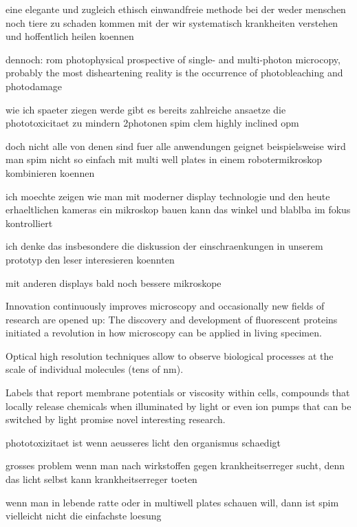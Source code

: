 eine elegante und zugleich ethisch einwandfreie methode bei der weder menschen noch tiere zu schaden kommen
mit der wir systematisch krankheiten verstehen und hoffentlich heilen koennen

dennoch:
rom photophysical prospective of single- and multi-photon
      microcopy, probably the most disheartening reality is the
      occurrence of photobleaching and photodamage

\citep{diaspro2009nanoscopy}


wie ich spaeter ziegen werde gibt es bereits zahlreiche ansaetze die phototoxicitaet zu mindern
2photonen spim clem highly inclined opm

doch nicht alle von denen sind fuer alle anwendungen geignet
beispielsweise wird man spim nicht so einfach mit multi well plates in
einem robotermikroskop kombinieren koennen

ich moechte zeigen wie man mit moderner display technologie und den heute erhaeltlichen kameras ein
mikroskop bauen kann das winkel und blablba im fokus kontrolliert 

ich denke das insbesondere die diskussion der einschraenkungen in
unserem prototyp den leser interesieren koennten


mit anderen displays bald noch bessere mikroskope



Innovation continuously improves microscopy and occasionally new        
fields of research are opened up: The discovery and development of
fluorescent proteins initiated a revolution in how microscopy can be
applied in living specimen. 

Optical high resolution techniques allow to observe biological          
processes at the scale of individual molecules (tens of nm).

Labels that report membrane potentials or viscosity within cells,       
compounds that locally release chemicals when illuminated by light or
even ion pumps that can be switched by light promise novel interesting
research.

phototoxizitaet ist wenn aeusseres licht den organismus schaedigt 

grosses problem wenn man nach wirkstoffen gegen krankheitserreger
sucht, denn das licht selbst kann krankheitserreger toeten

wenn man in lebende ratte oder in multiwell plates schauen will, dann
ist spim vielleicht nicht die einfachste loesung

